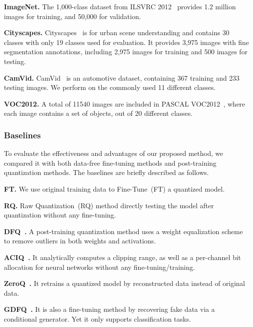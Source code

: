 \documentclass[final]{cvpr}
\begin{document}
\textbf{ImageNet.} The 1,000-class dataset from ILSVRC 2012~\cite{ILSVRC15} provides 1.2 million images for training, and 50,000 for validation.

\textbf{Cityscapes.} Cityscapes~\cite{Cordts2016Cityscapes} is for urban scene understanding and contains 30 classes with only 19 classes used for evaluation.
It provides 3,975 images with fine segmentation annotations, including 2,975 images for training and 500 images for testing.

\textbf{CamVid.} CamVid~\cite{brostow2008segmentation} is an automotive dataset, containing 367 training and 233 testing images. We perform on the commonly used 11 different classes.

\textbf{VOC2012.} A total of 11540 images are included in PASCAL VOC2012~\cite{everingham2011pascal}, where each image contains a set of objects, out of 20 different classes. 


\subsubsection{Baselines} 
To evaluate the effectiveness and advantages of our proposed method, we compared it with both data-free fine-tuning methods and post-training quantization methods. The baselines are briefly described as follows.

\textbf{FT.} We use original training data to Fine-Tune~(FT) a quantized model. 

\textbf{RQ.} Raw Quantization~(RQ) method directly testing the model after quantization without any fine-tuning.

\textbf{DFQ~\cite{nagel2019data}.} A post-training quantization method uses a weight equalization scheme to remove outliers in both weights and activations.

\textbf{ACIQ~\cite{banner2018aciq}.} It analytically computes a clipping range, as well as a per-channel bit allocation for neural networks without any fine-tuning/training.

\textbf{ZeroQ~\cite{cai2020zeroq}.} It retrains a quantized model by reconstructed data instead of original data. 

\textbf{GDFQ~\cite{xu2020generative}.} It is also a fine-tuning method by recovering fake data via a conditional generator. Yet it only supports classification tasks.
\end{document}
